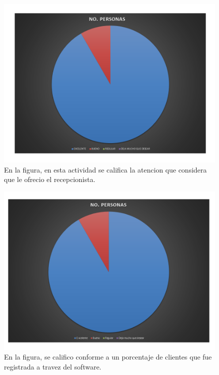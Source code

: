 \documentclass[a4paper,10pt]{report}
\begin{document}
\begin{figure}[H]
\centering
\includegraphics[scale=.7]{imagenes/Diapositiva5.PNG}
\caption{En la figura, en esta actividad se califica la atencion que considera que le ofrecio el recepcionista. }
\end{figure}

\begin{figure}[H]
\centering
\includegraphics[scale=.7]{imagenes/Diapositiva6.PNG}
\caption{En la figura, se califico conforme a un porcentaje de clientes que fue registrada a travez del software. }
\end{figure}
\end{document}
